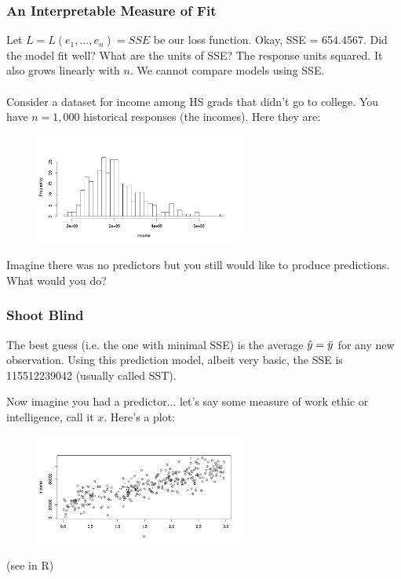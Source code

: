 \documentclass[slides]{beamer} %
\begin{document}
\begin{frame}\frametitle{An Interpretable Measure of Fit}

\small
Let $L = L(e_1, \ldots, e_n) = SSE$ be our loss function. Okay, SSE = 654.4567. Did the model fit well?   \pause What are the units of SSE?  \pause The response units squared.  \pause It also grows linearly with $n$. We cannot compare models using SSE.\\~\\

Consider a dataset for income among HS grads that didn't go to college. You have $n=1,000$ historical responses (the incomes). Here they are:

\vspace{-0.25cm}
\begin{figure}
\centering\includegraphics[width=2.7in]{incomes}
\end{figure}
 \pause 
	
\vspace{-0.25cm}
Imagine there was no predictors but you still would like to produce predictions. What would you do?
\end{frame}

\begin{frame}\frametitle{Shoot Blind}

The best guess (i.e. the one with minimal SSE) is the average $\hat{y} = \bar{y}$ for any new observation. Using this prediction model, albeit very basic, the SSE is 115512239042 (usually called SST). \pause 

Now imagine you had a predictor... let's say some measure of work ethic or intelligence, call it $x$. Here's a plot:

\vspace{-0.25cm}
\begin{figure}
\centering\includegraphics[width=2.7in]{income_by_x}
\end{figure}
	
(see in R)


\end{frame}
\end{document}
